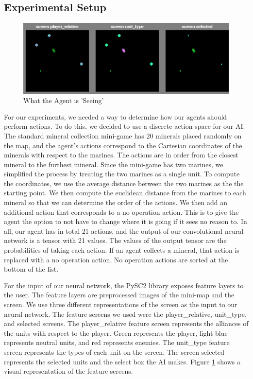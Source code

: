 \documentclass[12pt]{article}
\begin{document}
%
%
\subsection*{Experimental Setup}

\begin{figure} [h]
    \centering
    \includegraphics[width=1\textwidth, height=0.2\textheight]{screen.png}
    \caption{What the Agent is 'Seeing'}
    \label{fig:game_screen}
\end{figure}

For our experiments, we needed a way to determine how our agents should perform actions.  To do this, we decided to use a discrete action space for our AI.  The standard mineral collection mini-game has 20 minerals placed randomly on the map, and the agent’s actions correspond to the Cartesian coordinates of the minerals with respect to the marines.  The actions are in order from the closest mineral to the furthest mineral. Since the mini-game has two marines, we simplified the process by treating the two marines as a single unit.  To compute the coordinates, we use the average distance between the two marines as the the starting point.  We then compute the euclidean distance from the marines to each mineral so that we can determine the order of the actions.  We then add an additional action that corresponds to a no operation action.  This is to give the agent the option to not have to change where it is going if it sees no reason to.  In all, our agent has in total 21 actions, and the output of our convolutional neural network is a tensor with 21 values.  The values of the output tensor are the probabilities of taking each action.  If an agent collects a mineral, that action is replaced with a no operation action.  No operation actions are sorted at the bottom of the list.

For the input of our neural network, the PySC2 library exposes feature layers to the user.  The feature layers are preprocessed images of the mini-map and the screen.  We use three different representations of the screen as the input to our neural network.  The feature screens we used were the player\_relative, unit\_type, and selected screens.  The player\_relative feature screen represents the alliances of the units with respect to the player.  Green represents the player, light blue represents neutral units, and red represents enemies.  The unit\_type feature screen represents the types of each unit on the screen. The screen selected represents the selected units and the select box the AI makes. Figure \ref{fig:game_screen} shows a visual representation of the feature screens.
\end{document}
